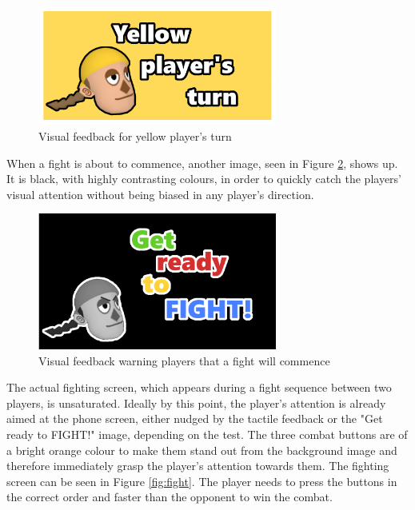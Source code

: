 \begin{figure}[h!]
	\centering
	\includegraphics[width=0.7\textwidth]{figures/yellowturn.png}
	\caption{Visual feedback for yellow player's turn}
	\label{fig:yellow_turn}
\end{figure}

When a fight is about to commence, another image, seen in Figure \ref{fig:get_ready}, shows up. It is black, with highly contrasting colours, in order to quickly catch the players' visual attention without being biased in any player's direction.

\begin{figure}[h!]
	\centering
	\includegraphics[width=0.7\textwidth]{figures/getready.png}
	\caption{Visual feedback warning players that a fight will commence}
	\label{fig:get_ready}
\end{figure}

The actual fighting screen, which appears during a fight sequence between two players, is unsaturated. Ideally by this point, the player's attention is already aimed at the phone screen, either nudged by the tactile feedback or the "Get ready to FIGHT!" image, depending on the test. The three combat buttons are of a bright orange colour to make them stand out from the background image and therefore immediately grasp the player's attention towards them. The fighting screen can be seen in Figure \ref{fig:fight}. The player needs to press the buttons in the correct order and faster than the opponent to win the combat. 

